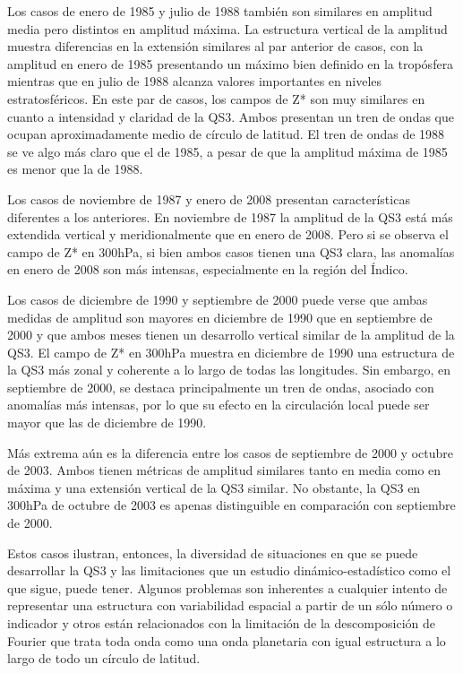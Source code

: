 \documentclass[spanish,a4paper,12pt,oneside]{book}
\begin{document}
Los casos de enero de 1985 y julio de 1988 también son similares en
amplitud media pero distintos en amplitud máxima. La estructura vertical
de la amplitud muestra diferencias en la extensión similares al par
anterior de casos, con la amplitud en enero de 1985 presentando un
máximo bien definido en la tropósfera mientras que en julio de 1988
alcanza valores importantes en niveles estratosféricos. En este par de
casos, los campos de Z* son muy similares en cuanto a intensidad y
claridad de la QS3. Ambos presentan un tren de ondas que ocupan
aproximadamente medio de círculo de latitud. El tren de ondas de 1988 se
ve algo más claro que el de 1985, a pesar de que la amplitud máxima de
1985 es menor que la de 1988.

Los casos de noviembre de 1987 y enero de 2008 presentan características
diferentes a los anteriores. En noviembre de 1987 la amplitud de la QS3
está más extendida vertical y meridionalmente que en enero de 2008. Pero
si se observa el campo de Z* en 300hPa, si bien ambos casos tienen una
QS3 clara, las anomalías en enero de 2008 son más intensas,
especialmente en la región del Índico.

Los casos de diciembre de 1990 y septiembre de 2000 puede verse que
ambas medidas de amplitud son mayores en diciembre de 1990 que en
septiembre de 2000 y que ambos meses tienen un desarrollo vertical
similar de la amplitud de la QS3. El campo de Z* en 300hPa muestra en
diciembre de 1990 una estructura de la QS3 más zonal y coherente a lo
largo de todas las longitudes. Sin embargo, en septiembre de 2000, se
destaca principalmente un tren de ondas, asociado con anomalías más
intensas, por lo que su efecto en la circulación local puede ser mayor
que las de diciembre de 1990.

Más extrema aún es la diferencia entre los casos de septiembre de 2000 y
octubre de 2003. Ambos tienen métricas de amplitud similares tanto en
media como en máxima y una extensión vertical de la QS3 similar. No
obstante, la QS3 en 300hPa de octubre de 2003 es apenas distinguible en
comparación con septiembre de 2000.

Estos casos ilustran, entonces, la diversidad de situaciones en que se
puede desarrollar la QS3 y las limitaciones que un estudio
dinámico-estadístico como el que sigue, puede tener. Algunos problemas
son inherentes a cualquier intento de representar una estructura con
variabilidad espacial a partir de un sólo número o indicador y otros
están relacionados con la limitación de la descomposición de Fourier que
trata toda onda como una onda planetaria con igual estructura a lo largo
de todo un círculo de latitud.
\end{document}
